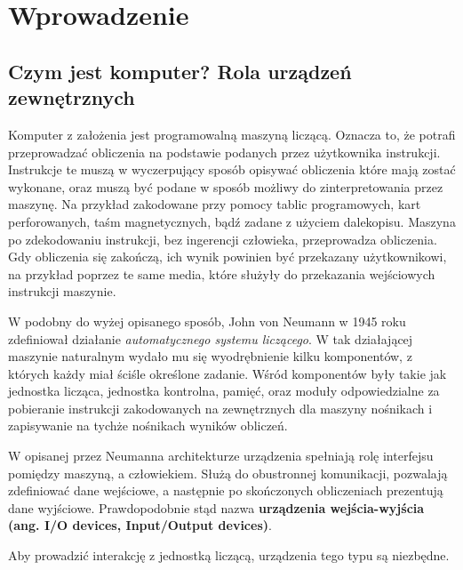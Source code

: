 \documentclass[shortabstract,inz]{iithesis}
\author         {Jan Mazur \and Wojciech Moczulski}
\date          {3 września 2018}
\begin{document}
\chapter{Wprowadzenie}
\section{Czym jest komputer? Rola urządzeń zewnętrznych} %

Komputer z założenia jest programowalną maszyną liczącą. Oznacza to, że potrafi
przeprowadzać obliczenia na podstawie podanych przez użytkownika instrukcji.
Instrukcje te muszą w wyczerpujący sposób opisywać obliczenia które mają zostać wykonane,
oraz muszą być podane w sposób możliwy do zinterpretowania przez maszynę.
Na przykład zakodowane przy pomocy tablic programowych, kart perforowanych, 
taśm magnetycznych, bądź zadane z użyciem dalekopisu.
Maszyna po zdekodowaniu instrukcji, bez ingerencji człowieka, przeprowadza obliczenia.
Gdy obliczenia się zakończą, ich wynik powinien być przekazany użytkownikowi, na przykład
poprzez te same media, które służyły do przekazania wejściowych instrukcji maszynie.

W podobny do wyżej opisanego sposób, John von Neumann w 1945 roku zdefiniował
działanie \textit{automatycznego systemu liczącego}\cite{paper:neumann}. 
W tak działającej maszynie naturalnym wydało mu się wyodrębnienie
kilku komponentów, z których każdy miał ściśle określone zadanie.
Wśród komponentów były takie jak jednostka licząca, jednostka kontrolna, pamięć, oraz moduły
odpowiedzialne za pobieranie instrukcji zakodowanych na zewnętrznych
dla maszyny nośnikach i zapisywanie na tychże nośnikach wyników
obliczeń.

W opisanej przez Neumanna architekturze urządzenia spełniają rolę
interfejsu pomiędzy maszyną, a człowiekiem. Służą do obustronnej
komunikacji, pozwalają zdefiniować dane wejściowe, a następnie po
skończonych obliczeniach prezentują dane wyjściowe. Prawdopodobnie stąd nazwa
\textbf{urządzenia wejścia-wyjścia (ang. I/O devices, Input/Output devices)}.

Aby prowadzić interakcję z jednostką liczącą, urządzenia tego typu są niezbędne.
\end{document}
